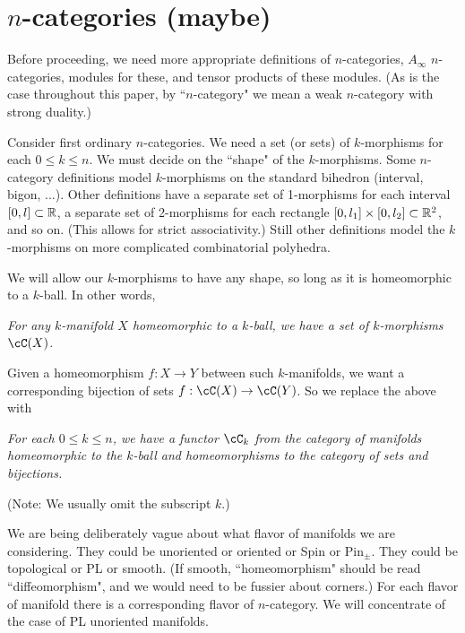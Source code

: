 
\def\xxpar#1#2{\smallskip\noindent{\bf #1} {\it #2} \smallskip}

\section{$n$-categories (maybe)}
\label{sec:ncats}


Before proceeding, we need more appropriate definitions of $n$-categories, 
$A_\infty$ $n$-categories, modules for these, and tensor products of these modules.
(As is the case throughout this paper, by ``$n$-category" we mean
a weak $n$-category with strong duality.)

Consider first ordinary $n$-categories.
We need a set (or sets) of $k$-morphisms for each $0\le k \le n$.
We must decide on the ``shape" of the $k$-morphisms.
Some $n$-category definitions model $k$-morphisms on the standard bihedron (interval, bigon, ...).
Other definitions have a separate set of 1-morphisms for each interval $[0,l] \subset \mathbb{R}$, 
a separate set of 2-morphisms for each rectangle $[0,l_1]\times [0,l_2] \subset \mathbb{R}^2$,
and so on.
(This allows for strict associativity.)
Still other definitions 
model the $k$-morphisms on more complicated combinatorial polyhedra.

We will allow our $k$-morphisms to have any shape, so long as it is homeomorphic to a $k$-ball.
In other words,

\xxpar{Morphisms (preliminary version):}
{For any $k$-manifold $X$ homeomorphic 
to a $k$-ball, we have a set of $k$-morphisms
$\cC(X)$.}

Given a homeomorphism $f:X\to Y$ between such $k$-manifolds, we want a corresponding
bijection of sets $f:\cC(X)\to \cC(Y)$.
So we replace the above with

\xxpar{Morphisms:}
{For each $0 \le k \le n$, we have a functor $\cC_k$ from 
the category of manifolds homeomorphic to the $k$-ball and 
homeomorphisms to the category of sets and bijections.}

(Note: We usually omit the subscript $k$.)

We are being deliberately vague about what flavor of manifolds we are considering.
They could be unoriented or oriented or Spin or $\mbox{Pin}_\pm$.
They could be topological or PL or smooth.
(If smooth, ``homeomorphism" should be read ``diffeomorphism", and we would need
to be fussier about corners.)
For each flavor of manifold there is a corresponding flavor of $n$-category.
We will concentrate of the case of PL unoriented manifolds.

